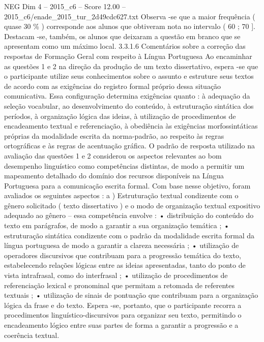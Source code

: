 \begin{textsample}{NEG Dim 4 – 2015\_c6 – Score 12.00 – 2015\_c6/enade\_2015\_tur\_2d49cdc627.txt}
Observa -se que a maior frequência ( quase 30 \% ) corresponde aos alunos que obtiveram nota no intervalo ( 60 ; 70 ].
Destacam -se, também, os alunos que deixaram a questão em branco que se apresentam como um máximo local. 3.3.1.6 Comentários sobre a correção das respostas de Formação Geral com respeito à Língua Portuguesa Ao encaminhar as questões 1 e 2 na direção da produção de um texto dissertativo, espera -se que o participante utilize seus conhecimentos sobre o assunto e estruture seus textos de acordo com as exigências do registro formal próprio dessa situação comunicativa.
Essa configuração determina exigências quanto : à adequação da seleção vocabular, ao desenvolvimento do conteúdo, à estruturação sintática dos períodos, à organização lógica das ideias, à utilização de procedimentos de encadeamento textual e referenciação, à obediência às exigências morfossintáticas próprias da modalidade escrita da norma-padrão, ao respeito às regras ortográficas e às regras de acentuação gráfica.
O padrão de resposta utilizado na avaliação das questões 1 e 2 considerou os aspectos relevantes ao bom desempenho linguístico como competências distintas, de modo a permitir um mapeamento detalhado do domínio dos recursos disponíveis na Língua Portuguesa para a comunicação escrita formal.
Com base nesse objetivo, foram avaliados os seguintes aspectos : a ) Estruturação textual condizente com o gênero solicitado ( texto dissertativo ) e o modo de organização textual expositivo adequado ao gênero – essa competência envolve : • distribuição do conteúdo do texto em parágrafos, de modo a garantir a sua organização temática ; • estruturação sintática condizente com o padrão da modalidade escrita formal da língua portuguesa de modo a garantir a clareza necessária ; • utilização de operadores discursivos que contribuam para a progressão temática do texto, estabelecendo relações lógicas entre as ideias apresentadas, tanto do ponto de vista intrafrasal, como do interfrasal ; • utilização de procedimentos de referenciação lexical e pronominal que permitam a retomada de referentes textuais ; • utilização de sinais de pontuação que contribuam para a organização lógica da frase e do texto.
Espera -se, portanto, que o participante recorra a procedimentos linguístico-discursivos para organizar seu texto, permitindo o encadeamento lógico entre suas partes de forma a garantir a progressão e a coerência textual.

\end{textsample}
